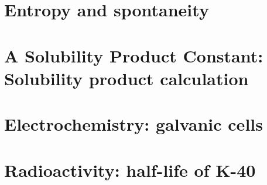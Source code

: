 \documentclass{book}
\newcommand\labname{}\newcommand\texbooklabel{}\newcommand\pathtofiles{}
\begin{document}
\newpage \section{Entropy and spontaneity}
\newpage  \section{A Solubility Product Constant: Solubility product calculation}
\clearpage\mbox{}\clearpage \section{Electrochemistry: galvanic cells}

\renewcommand\labname{../\texbooklabel/LAB-nuclear}\renewcommand\texbooklabel{Ch-nuclear}\renewcommand\pathtofiles{../\texbooklabel/}
\section{Radioactivity: half-life of K-40}
\end{document}
